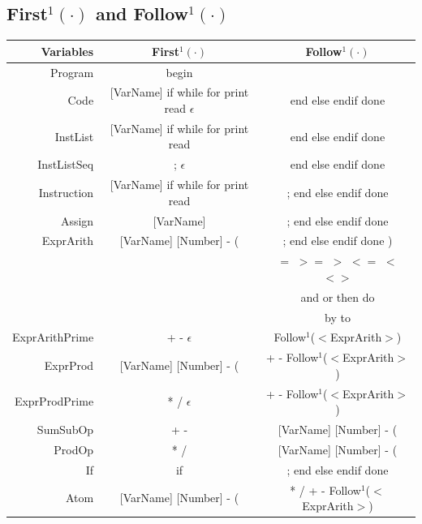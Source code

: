 \documentclass[letterpaper]{article}
\begin{document}
\subsection{First$^1(\cdot)$ and Follow$^1(\cdot)$}
\begin{center}
    \renewcommand{\arraystretch}{1.5}
    \begin{tabular}{| r || c | c |}
        \hline
        \textbf{Variables} & \textbf{First$^1(\cdot)$}
        & \textbf{Follow$^1(\cdot)$} \\
        \hline
        \hline
        Program & begin & \\
        \hline
        Code & [VarName] if while for print read $\epsilon$ &
        end else endif done \\
        \hline
        InstList & [VarName] if while for print read &
        end else endif done \\
        \hline
        InstListSeq & ; $\epsilon$ &
        end else endif done \\
        \hline
        Instruction & [VarName] if while for print read &
        ; end else endif done \\
        \hline
        Assign & [VarName] &
        ; end else endif done \\
        \hline
        ExprArith & [VarName] [Number] - ( &
        ; end else endif done ) \\
        & & $=$ $>=$ $>$ $<=$ $<$ $<>$ \\
        & & and or then do \\
        & &  by to\\
        \hline
        ExprArithPrime & + - $\epsilon$ &
        Follow$^1$($<$ExprArith$>$) \\
        \hline
        ExprProd & [VarName] [Number] - ( &
        + - Follow$^1$($<$ExprArith$>$) \\
        \hline
        ExprProdPrime & * / $\epsilon$ &
        + - Follow$^1$($<$ExprArith$>$) \\
        \hline
        SumSubOp & + - & [VarName] [Number] - ( \\
        \hline
        ProdOp & * / & [VarName] [Number] - ( \\
        \hline
        If & if & ; end else endif done \\
        \hline
        Atom & [VarName] [Number] - ( &
        * / + - Follow$^1$($<$ExprArith$>$) \\
        \hline

\end{tabular}
\end{center}
\end{document}
